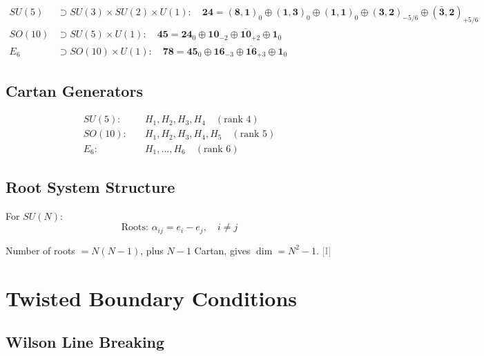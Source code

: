 \documentclass[11pt,a4paper]{article}
\newcommand{\tagI}{\textcolor{gray}{[I]}}
\begin{document}
\begin{align}
\label{eq:branch-su5}
SU(5) &\supset SU(3) \times SU(2) \times U(1): \quad \mathbf{24} = (\mathbf{8},\mathbf{1})_0 \oplus (\mathbf{1},\mathbf{3})_0 \oplus (\mathbf{1},\mathbf{1})_0 \oplus (\mathbf{3},\mathbf{2})_{-5/6} \oplus (\bar{\mathbf{3}},\mathbf{2})_{+5/6} \\
\label{eq:branch-so10}
SO(10) &\supset SU(5) \times U(1): \quad \mathbf{45} = \mathbf{24}_0 \oplus \mathbf{10}_{-2} \oplus \overline{\mathbf{10}}_{+2} \oplus \mathbf{1}_0 \\
\label{eq:branch-e6}
E_6 &\supset SO(10) \times U(1): \quad \mathbf{78} = \mathbf{45}_0 \oplus \mathbf{16}_{-3} \oplus \overline{\mathbf{16}}_{+3} \oplus \mathbf{1}_0
\end{align}

\subsection{Cartan Generators}

\begin{align}
\label{eq:cartan-su5}
SU(5): \quad & H_1, H_2, H_3, H_4 \quad (\text{rank } 4) \\
\label{eq:cartan-so10}
SO(10): \quad & H_1, H_2, H_3, H_4, H_5 \quad (\text{rank } 5) \\
\label{eq:cartan-e6}
E_6: \quad & H_1, \ldots, H_6 \quad (\text{rank } 6)
\end{align}

\subsection{Root System Structure}

For $SU(N)$:
\begin{equation}
\label{eq:roots-su}
\text{Roots: } \alpha_{ij} = e_i - e_j, \quad i \neq j
\end{equation}

Number of roots $= N(N-1)$, plus $N-1$ Cartan, gives $\dim = N^2 - 1$. \tagI

\section{Twisted Boundary Conditions}
\label{app:twisted}

\subsection{Wilson Line Breaking}
\end{document}
